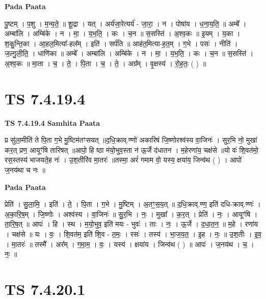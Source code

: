 \documentclass[17pt]{extarticle}
\begin{document}
\textbf{Pada Paata} \newline

पु॒ष्टम् । प॒शु । म॒न्य॒ते॒ ॥ शू॒द्रा । यत् । अर्य॑जा॒रेत्यर्य॑ - जा॒रा॒ । न । पोषा॑य । ध॒ना॒य॒ति॒ ॥ अम्बे᳚ । अम्बा॑लि । अम्बि॑के । न । मा॒ । य॒भ॒ति॒ । कः । च॒न ॥ स॒सस्ति॑ । अ॒श्व॒कः ॥ इ॒यम् । य॒का । श॒कु॒न्ति॒का । आ॒हल॒मित्या᳚-हल᳚म् । इति॑ । सर्प॑ति ॥ आह॑त॒मित्या-ह॒त॒म् । ग॒भे । पसः॑ । नीति॑ । ज॒ल्गु॒ली॒ति॒ । धाणि॑का ॥ अम्बे᳚ । अम्बा॑लि । अम्बि॑के । न । मा॒ । य॒भ॒ति॒ । कः । च॒न ॥ स॒सस्ति॑ । अ॒श्व॒कः ॥ मा॒ता । च॒ । ते॒ । पि॒ता । च॒ । ते॒ । अग्र᳚म् । वृ॒क्षस्य॑ । रो॒ह॒तः॒ ( ) ॥  \newline





\section{ TS 7.4.19.4 }

\textbf{TS 7.4.19.4 } \newline
\textbf{Samhita Paata} \newline

प्र सु॑ला॒मीति॑ ते पि॒ता ग॒भे मु॒ष्टिम॑तꣳसयत् ॥द॒धि॒क्राव्.ण्णो॑ अकारिषं जि॒ष्णोरश्व॑स्य वा॒जिनः॑ । सुर॒भि नो॒ मुखा॑ कर॒त् प्रण॒ आयूꣳ॑षि तारिषत् ॥आपो॒ हि ष्ठा म॑यो॒भुव॒स्ता न॑ ऊ॒र्जे द॑धातन । म॒हेरणा॑य॒ चक्ष॑से ॥यो वः॑ शि॒वत॑मो॒ रस॒स्तस्य॑ भाजयते॒ह नः॑ । उ॒श॒तीरि॑व मा॒तरः॑ ॥तस्मा॒ अरं॑ गमाम वो॒ यस्य॒ क्षया॑य॒ जिन्व॑थ ( ) । आपो॑ ज॒नय॑था च नः ॥ \newline

\textbf{Pada Paata} \newline

प्रेति॑ । सु॒ला॒मि॒ । इति॑ । ते॒ । पि॒ता । ग॒भे । मु॒ष्टिम् । अ॒तꣳ॒॒स॒य॒त् ॥ द॒धि॒क्राव्.ण्ण॒ इति॑ दधि-क्राव्.ण्णः॑ । अ॒का॒रि॒ष॒म् । जि॒ष्णोः । अश्व॑स्य । वा॒जिनः॑ ॥ सु॒र॒भि । नः॒ । मुखा᳚ । क॒र॒त् । प्रेति॑ । नः॒ । आयूꣳ॑षि । ता॒रि॒ष॒त् ॥ आपः॑ । हि । स्थ । म॒यो॒भुव॒ इति॑ मयः - भुवः॑ । ताः । नः॒ । ऊ॒र्जे । द॒धा॒त॒न॒ ॥ म॒हे । रणा॑य । चक्ष॑से ॥ यः । वः॒ । शि॒वत॑म॒ इति॑ शि॒व - त॒मः॒ । रसः॑ । तस्य॑ । भा॒ज॒य॒त॒ । इ॒ह । नः॒ ॥ उ॒श॒तीः । इ॒व॒ । मा॒तरः॑ ॥ तस्मै᳚ । अर᳚म् । ग॒मा॒म॒ । वः॒ । यस्य॑ । क्षया॑य । जिन्व॑थ ( ) ॥ आपः॑ । ज॒नय॑थ । च॒ । नः॒ ॥  \newline





\section{ TS 7.4.20.1 }
\end{document}
